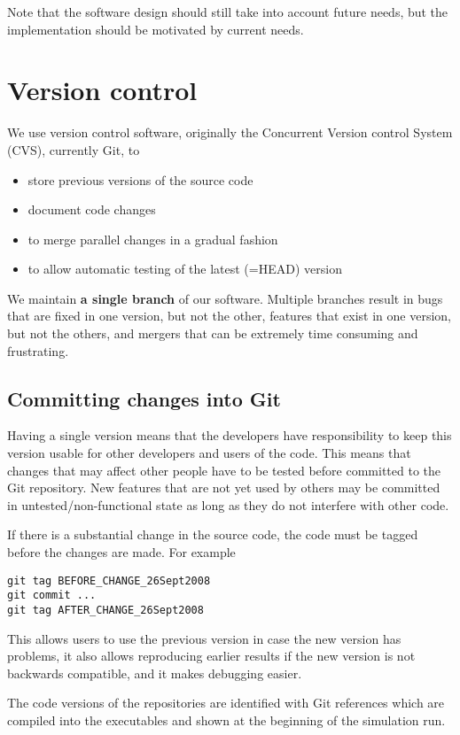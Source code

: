 \documentclass{article}
\begin{document}
Note that the software design should still take into account future needs,
but the implementation should be motivated by current needs.

\section{Version control}

We use version control software, originally the
Concurrent Version control System (CVS), currently Git, to 
\begin{itemize}
\item store previous versions of the source code
\item document code changes
\item to merge parallel changes in a gradual fashion
\item to allow automatic testing of the latest (=HEAD) version
\end{itemize}
We maintain {\bf a single branch} of our software. 
Multiple branches result in bugs that are fixed in one version, but not the 
other, features that exist in one version, but not the others, and mergers
that can be extremely time consuming and frustrating.

\subsection{Committing changes into Git}

Having a single version means that the developers have responsibility to 
keep this version usable for other developers and users of the code. This
means that changes that may affect other people have to be tested before
committed to the Git repository. New features that are not yet used by others
may be committed in untested/non-functional state as long as they do not 
interfere with other code.

If there is a substantial change in the source code, the code must be 
tagged before the changes are made. For example
\begin{verbatim}
git tag BEFORE_CHANGE_26Sept2008
git commit ...
git tag AFTER_CHANGE_26Sept2008
\end{verbatim}
This allows users to use the previous version in case the new version has
problems, it also allows reproducing earlier results if the new version is
not backwards compatible, and it makes debugging easier.

The code versions of the repositories are identified with Git
references which are compiled into the executables and shown at the
beginning of the simulation run.
\end{document}
